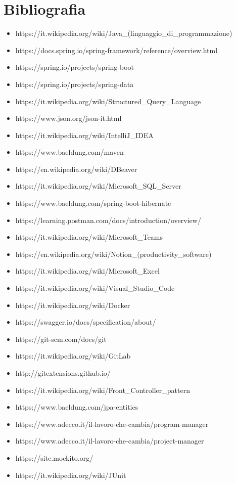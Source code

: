 \cleardoublepage
\chapter{Bibliografia}

\nocite{*}

\printbibliography[heading=subbibliography,title={Riferimenti bibliografici},type=book]

\printbibliography[heading=subbibliography,title={Siti web consultati},type=online]

\begin{itemize}
\item https://it.wikipedia.org/wiki/Java\_(linguaggio\_di\_programmazione)
\item https://docs.spring.io/spring-framework/reference/overview.html
\item https://spring.io/projects/spring-boot
\item https://spring.io/projects/spring-data
\item https://it.wikipedia.org/wiki/Structured\_Query\_Language
\item https://www.json.org/json-it.html
\item https://it.wikipedia.org/wiki/IntelliJ\_IDEA
\item https://www.baeldung.com/maven
\item https://en.wikipedia.org/wiki/DBeaver
\item https://it.wikipedia.org/wiki/Microsoft\_SQL\_Server
\item https://www.baeldung.com/spring-boot-hibernate
\item https://learning.postman.com/docs/introduction/overview/
\item https://it.wikipedia.org/wiki/Microsoft\_Teams
\item https://en.wikipedia.org/wiki/Notion\_(productivity\_software)
\item https://it.wikipedia.org/wiki/Microsoft\_Excel
\item https://it.wikipedia.org/wiki/Visual\_Studio\_Code
\item https://it.wikipedia.org/wiki/Docker
\item https://swagger.io/docs/specification/about/
\item https://git-scm.com/docs/git
\item https://it.wikipedia.org/wiki/GitLab
\item http://gitextensions.github.io/
\item https://it.wikipedia.org/wiki/Front\_Controller\_pattern
\item https://www.baeldung.com/jpa-entities
\item https://www.adecco.it/il-lavoro-che-cambia/program-manager
\item https://www.adecco.it/il-lavoro-che-cambia/project-manager
\item https://site.mockito.org/
\item https://it.wikipedia.org/wiki/JUnit

\end{itemize}